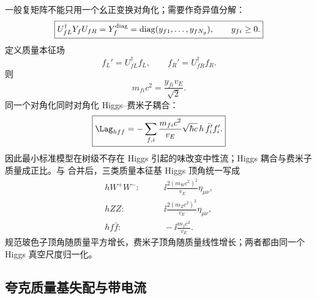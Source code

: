 \begin{proposition}
一般复矩阵不能只用一个幺正变换对角化；需要作奇异值分解：
\begin{equation}
 \boxed{
 U_{fL}^\dagger Y_fU_{fR}
 =Y_f^{\rm diag}
 =\operatorname{diag}(y_{f1},\ldots,y_{fN_g}),
 \qquad y_{fi}\ge0.}
 \label{eq:yukawa-svd-dp11}
\end{equation}
定义质量本征场
\begin{equation}
 f_L'=U_{fL}^\dagger f_L,
 \qquad
 f_R'=U_{fR}^\dagger f_R.
 \label{eq:mass-basis-fields-dp11}
\end{equation}
则
\begin{equation}
 \boxed{m_{fi}c^2=\frac{y_{fi}v_E}{\sqrt2}.}
 \label{eq:fermion-masses-yukawa-dp11}
\end{equation}
同一个对角化同时对角化 Higgs--费米子耦合：
\begin{equation}
 \boxed{
 \Lag_{hff}
 =-\sum_{f,i}
 \frac{m_{fi}c^2}{v_E}
 \sqrt{\hbar c}\,h\,\bar f_i'f_i'.}
 \label{eq:higgs-fermion-coupling-dp11}
\end{equation}
因此最小标准模型在树级不存在 Higgs 引起的味改变中性流；Higgs 耦合与费米子质量成正比。与 合并后，三类质量本征基 Higgs 顶角统一写成
\begin{align}
 hW^+W^-:&\qquad \ii\frac{2(m_Wc^2)^2}{v_E}\eta_{\mu\nu},\\
 hZZ:&\qquad \ii\frac{2(m_Zc^2)^2}{v_E}\eta_{\mu\nu},\\
 hf\bar f:&\qquad -\ii\frac{m_fc^2}{v_E}.
 \label{eq:sm-higgs-massbasis-rules-dp11}
\end{align}
规范玻色子顶角随质量平方增长，费米子顶角随质量线性增长；两者都由同一个 Higgs 真空尺度归一化。
\end{proposition}



\subsection{夸克质量基失配与带电流}

